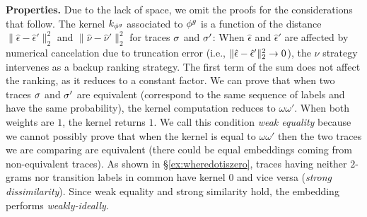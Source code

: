 
\noindent
\textbf{Properties.}\label{subsub:prop} Due to the lack of space, we omit the proofs for the considerations that follow. The kernel $k_{{\phi^{g}}}$ associated to ${\phi^{g}}$ is {a function of the distance  $\|\hat{\epsilon}-\hat{\epsilon}'\|_2^2$ and $\|\hat{\nu}-\hat{\nu}'\|_2^2$ for traces $\sigma$ and ${{\sigma'}}$:}
When $\hat{\epsilon}$ and $\hat{\epsilon}'$ are affected by numerical cancelation due to truncation error (i.e., $\|\hat{\epsilon}-\hat{\epsilon}'\|_{2}^2\to 0$), the $\nu$ strategy intervenes as a backup ranking strategy. The first term of the sum does not affect the ranking, as it reduces to a constant factor.
%
We can prove that when two traces $\sigma$ and ${{\sigma'}}$ are equivalent (correspond to the same sequence of labels and have the same probability), the kernel computation reduces to $\omega\omega'$. When both weights are $1$, the kernel returns $1$. We call this condition \textit{weak equality} because we cannot possibly prove that when the kernel is equal to $\omega\omega'$ then the two traces we are comparing are equivalent (there could be equal embeddings coming from non-equivalent traces). As shown in \S\ref{ex:wheredotiszero}, traces having neither $2$-grams nor transition labels in common have kernel $0$ and vice versa (\textit{strong dissimilarity}). Since weak equality and strong similarity hold, the embedding performs \textit{weakly-ideally}.

